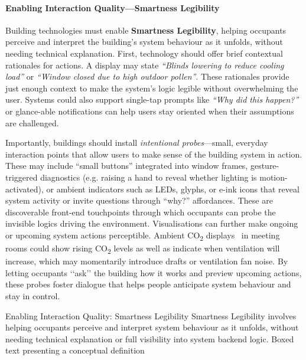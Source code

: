 \paragraph{Enabling Interaction Quality---Smartness Legibility}
Building technologies must enable \textbf{Smartness Legibility}, helping occupants perceive and interpret the building's system behaviour as it unfolds, without needing technical explanation. First, technology should offer brief contextual rationales for actions. A display may state \textit{“Blinds lowering to reduce cooling load”} or \textit{“Window closed due to high outdoor pollen”}. These rationales provide just enough context to make the system's logic legible without overwhelming the user. Systems could also support single-tap prompts like \textit{``Why did this happen?''} or glance-able notifications can help users stay oriented when their assumptions are challenged. 

Importantly, buildings should install \textit{intentional probes}---small, everyday interaction points that allow users to make sense of the building system in action. These may include ``small buttons'' integrated into window frames, gesture-triggered diagnostics (e.g. raising a hand to reveal whether lighting is motion-activated), or ambient indicators such as LEDs, glyphs, or e-ink icons that reveal system activity or invite questions through ``why?” affordances. These are discoverable front-end touchpoints through which occupants can probe the invisible logics driving the environment. Visualisations can further make ongoing or upcoming system actions perceptible. Ambient CO\textsubscript{2} displays~\cite{margariti2024evaluating} in meeting rooms could show rising CO\textsubscript{2} levels as well as indicate when ventilation will increase, which may momentarily introduce drafts or ventilation fan noise. By letting occupants ‘‘ask’’ the building how it works and preview upcoming actions, these probes foster dialogue that helps people anticipate system behaviour and stay in control.



\designbox
{Enabling Interaction Quality: Smartness Legibility}
{Smartness Legibility involves helping occupants perceive and interpret system behaviour as it unfolds, without needing technical explanation or full visibility into system backend logic.}
{Boxed text presenting a conceptual definition}


